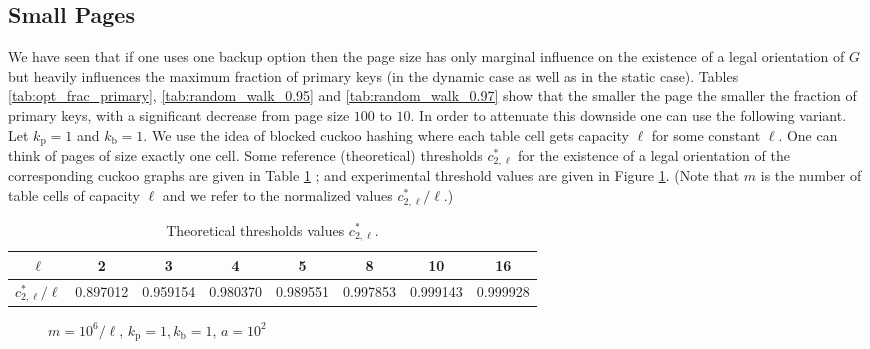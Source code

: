 \let\accentvec\vec \documentclass{llncs}
\newcommand{\kprim}{{k_{\mathrm{p}}}}
\newcommand{\kback}{{k_{\mathrm{b}}}}
\newcommand{\imgScale}{0.58}
\newcommand{\figPath}{.}
\begin{document}
\subsection{Small Pages}
We have seen that if one uses one backup option then the page size has only marginal influence on the existence of a legal orientation of $G$ but heavily influences the maximum fraction of primary keys (in the dynamic case as well as in the static case). 
Tables \ref{tab:opt_frac_primary}, \ref{tab:random_walk_0.95} and \ref{tab:random_walk_0.97} show that the smaller the page the 
smaller the fraction of primary keys, with a significant decrease from page size $100$ to $10$.
In order to attenuate this downside one can use the following variant.
Let $\kprim=1$ and $\kback=1$. We use the idea of blocked cuckoo hashing \cite{CainSW2007,dietzfelbinger2007balanced,FernholzR2007}
where each table cell gets capacity $\ell$ for some constant $\ell$. One can think of pages of size exactly one cell. Some reference (theoretical) thresholds $c^*_{2,\ell}$ for the existence of a legal orientation of the corresponding cuckoo graphs are given in Table \ref{tab:2,l-ary} \cite{CainSW2007,FernholzR2007}; and experimental threshold values are given in Figure \ref{fig:2,l-ary}. (Note that $m$ is the number of table cells of capacity $\ell$ and we refer to the normalized values $c^*_{2,\ell}/\ell$.)

\begin{table}[htb]
\centering
\begin{tabular}{c|ccccccc}
 $\ell$                   &  2        & 3        & 4        & 5        & 8        & 10       & 16    \\\hline
${c^*_{2,\ell}}/{ \ell }$ &  0.897012 & 0.959154 & 0.980370 & 0.989551 & 0.997853 & 0.999143 & 0.999928
\end{tabular}
\vspace{0.2cm}
\caption{\label{tab:2,l-ary}Theoretical thresholds values $c^*_{2,\ell}$.}
\end{table}






\begin{figure}
\subfigure[$\ell=4$]{\scalebox{\imgScale}{}}
\subfigure[$\ell=16$]{\scalebox{\imgScale}{}}
\caption{\label{fig:2,l-ary} $m=10^6/\ell$, $\kprim=1, \kback=1$,  $a=10^2$}
\end{figure}
\end{document}
